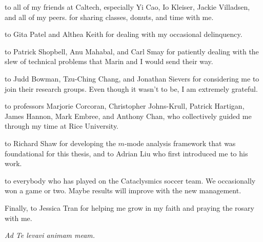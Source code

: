 \documentclass[12pt]{caltech_thesis}
\begin{document}
\begin{acknowledgements}
    \Ty to all of my friends at Caltech, especially Yi Cao, Io Kleiser, Jackie Villadsen, and all of
    my peers. \Ty for sharing classes, donuts, and time with me.

    \Ty to Gita Patel and Althea Keith for dealing with my occasional delinquency.

    \Ty to Patrick Shopbell, Anu Mahabal, and Carl Smay for patiently dealing with the slew of
    technical problems that Marin and I would send their way.

    \Ty to Judd Bowman, Tzu-Ching Chang, and Jonathan Sievers for considering me to join their
    research groups. Even though it wasn't to be, I am extremely grateful.

    \Ty to professors Marjorie Corcoran, Christopher Johns-Krull, Patrick Hartigan, James
    Hannon, Mark Embree, and Anthony Chan, who collectively guided me through my time at Rice
    University.

    \Ty to Richard Shaw for developing the $m$-mode analysis framework that was foundational for
    this thesis, and to Adrian Liu who first introduced me to his work.

    \Ty to everybody who has played on the Cataclysmics soccer team. We occasionally won a game or
    two. Maybe results will improve with the new management.

    Finally, \ty to Jessica Tran for helping me grow in my faith and praying the rosary with me.

    \textit{Ad Te levavi animam meam.}

\end{acknowledgements}
\end{document}
